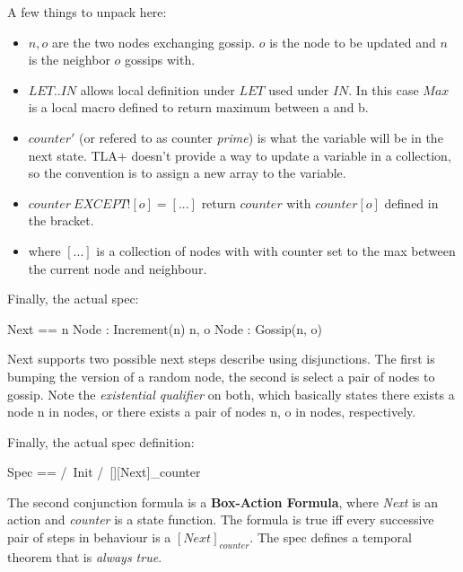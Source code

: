 \documentclass{report}
\begin{document}
A few things to unpack here:
\begin{itemize}
    \item $n, o$ are the two nodes exchanging gossip. $o$ is the node to be updated
    and $n$ is the neighbor $o$ gossips with.
    \item $LET .. IN$ allows local definition under $LET$ used under
    $IN$. In this case $Max$ is a local macro defined to return maximum between a and b.
    \item $counter'$ (or refered to as counter \textit{prime}) is what the
    variable will be in the next state. TLA+ doesn't provide a way to update a
    variable in a collection, so the convention is to assign a new array to the variable. 
    \item $counter\ EXCEPT ![o] = [...]$ return $counter$ with $counter[o]$
    defined in the bracket. 
    \item where $[...]$ is a collection of nodes with with counter set to the
    max between the current node and neighbour.
\end{itemize}

Finally, the actual spec: 
\begin{tla}
    Next == \/ \E n \in Node : Increment(n)
            \/ \E n, o \in Node : Gossip(n, o)
\end{tla}
\begin{tlatex}
%
\end{tlatex}

Next supports two possible next steps describe using disjunctions. The first is
bumping the version of a random node, the second is select a pair of nodes to
gossip. Note the \textit{existential qualifier} on both, which basically states
there exists a node n in nodes, or there exists a pair of nodes n, o in nodes,
respectively.\newline

Finally, the actual spec definition:
\begin{tla}
    Spec == /\ Init
            /\ [][Next]_counter  
\end{tla}
\begin{tlatex}
%
%
\end{tlatex}

The second conjunction formula is a \textbf{Box-Action Formula}, where
\textit{Next} is an action and \textit{counter} is a state function. The formula
is true iff every successive pair of steps in behaviour is a $[Next]_{counter}$.
The spec defines a temporal theorem that is \textit{always true}. 
\end{document}
